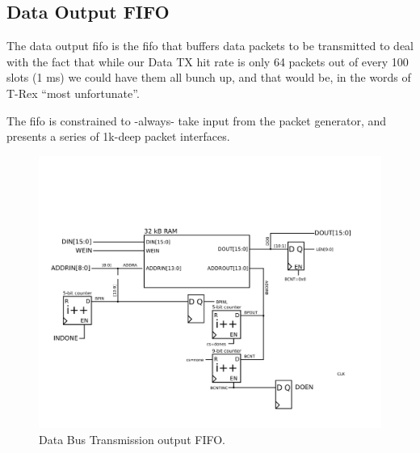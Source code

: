 \subsection{Data Output FIFO}
The data output fifo is the fifo that buffers data packets to be
transmitted to deal with the fact that while our Data TX hit rate is
only 64 packets out of every 100 slots (1 ms) we could have them all
bunch up, and that would be, in the words of T-Rex ``most
unfortunate''.

The fifo is constrained to -always- take input from the packet
generator, and presents a series of 1k-deep packet interfaces.




\begin{figure}
\begin{centering}
\includegraphics[scale=0.8]{data.outputfifo.svg}
\end{centering}
\caption{Data Bus Transmission output FIFO.}
\label{data.outputfifo}
\end{figure}
